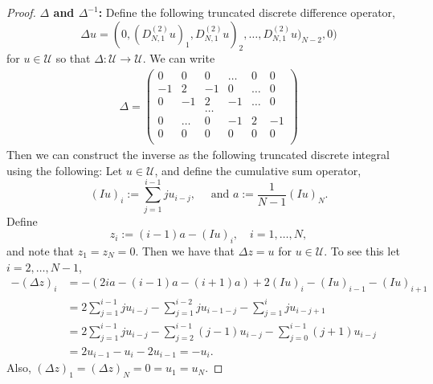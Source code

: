 \documentclass[ejs,noshowframe]{imsart}
\theoremstyle{plain}
\theoremstyle{definition}
\newcommand{\cU}{\mathcal{U}}
\begin{document}
\begin{appendix}
\begin{proof}
\noindent	
	\textbf{$\Delta$ and $\Delta^{-1}$:}
	Define the following truncated discrete difference operator,
	\[
	\Delta u = (0, (D^{(2)}_{N,1} u)_1, D^{(2)}_{N,1} u)_2, \ldots, D^{(2)}_{N,1} 
	u)_{N-2}, 0)
	\]
	for $u \in \cU$ so that $\Delta : \cU \to \cU$.
	We can write
\begin{align}
	\label{eq:Delta}
	\Delta = 
	\left( \begin{array}{cccccc}
		0 & 0 & 0 & \ldots & 0 & 0 \\
		-1 & 2 & -1 & 0 &\ldots &0 \\
		0 & -1 & 2 & -1 & \ldots & 0\\
		& & \ldots & & & \\
		0 & \ldots & 0 & -1 & 2 & -1 \\
		0 & 0 & 0 & 0 & 0 & 0\\
	\end{array} \right)
	\end{align}
	Then we can construct the inverse as the following truncated discrete 
	integral using the following:
	Let $u \in \cU$, and define the cumulative sum operator,
	\[
	(I u)_i := \sum_{j=1}^{i-1} j u_{i-j}, \quad \text{ and }
	a := \frac{1}{N-1} (Iu)_N.
	\]
	Define
	\[
	z_i := (i-1) a - (I u)_i, \quad i=1,\ldots, N,
	\]
and note that $z_1 = z_N = 0.$
	Then we have that $\Delta z = u$ for $u \in \cU$.
	To see this let $i = 2, \ldots, N-1$,
	\begin{align}
		- (\Delta z)_i &= - (2i a - (i-1) a - (i+1) a) + 2 (Iu)_i - (Iu)_{i-1} - 
		(Iu)_{i+1}\\
		&= 2 \sum_{j=1}^{i - 1} j u_{i - j} - \sum_{j=1}^{i-2} j 
		u_{i-1-j} - \sum_{j=1}^{i} j u_{i-j+1}\\
		&= 2 \sum_{j=1}^{i - 1} j u_{i - j} - \sum_{j=2}^{i-1} (j-1) u_{i-j} - 
		\sum_{j=0}^{i-1} (j+1) u_{i-j}\\ 
		&= 2 u_{i-1} - u_i - 2 u_{i-1} = -u_i.
	\end{align}
	Also, $(\Delta z)_{1} = (\Delta z)_{N}=0 = u_1 = u_N.$
	

\end{proof}
\end{appendix}
\end{document}
